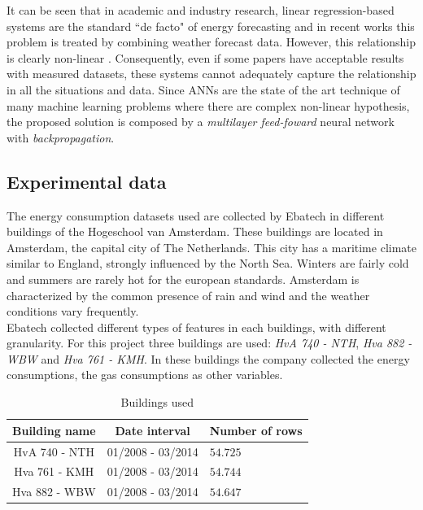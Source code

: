 \documentclass{sig-alternate-sigmod07}
\begin{document}
It can be seen that in academic and industry research, linear regression-based systems are the standard ``de facto" of energy forecasting and in recent works this problem is treated by combining weather forecast data. However, this relationship is clearly non-linear \cite{hippert2001neural}. Consequently, even if some papers have acceptable results with measured datasets, these systems cannot adequately capture the relationship in all the situations and data. Since ANNs are the state of the art technique of many machine learning problems where there are complex non-linear hypothesis, the proposed solution is composed by a \textit{multilayer feed-foward} neural network with \textit{backpropagation}. 


\subsection{Experimental data}
The energy consumption datasets used are collected by Ebatech in different buildings of the Hogeschool van Amsterdam. These buildings are located in Amsterdam, the capital city of The Netherlands. This city has a maritime climate similar to England, strongly influenced by the North Sea. Winters are fairly cold and summers are rarely hot for the european standards. Amsterdam is characterized by the common presence of rain and wind and the weather conditions vary frequently.\\
Ebatech collected different types of features in each buildings, with different granularity. For this project three buildings are used: \textit{HvA 740 - NTH}, \textit{Hva 882 - WBW} and \textit{Hva 761 - KMH}. In these buildings the company collected the energy consumptions, the gas consumptions as other variables.

\begin{table}
\centering
\caption{Buildings used}
\label{tab:dataset}
\begin{tabular}{|c|c|l|} \hline
Building name&Date interval&Number of rows\\ \hline\hline
HvA 740 - NTH & 01/2008 - 03/2014 & $54.725$\\ \hline
Hva 761 - KMH & 01/2008 - 03/2014 & $54.744$\\ \hline
Hva 882 - WBW& 01/2008 - 03/2014 & $54.647$\\ \hline
\end{tabular}
\end{table}
\end{document}
